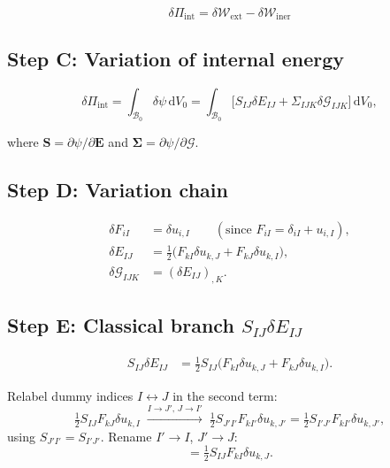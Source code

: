 \documentclass[11pt]{article}
\begin{document}
\begin{equation}
\boxed{\delta\Pi_{\mathrm{int}} = \delta\mathcal{W}_{\mathrm{ext}} - \delta\mathcal{W}_{\mathrm{iner}}}
\label{app:equilibrium}
\end{equation}

\subsection{Step C: Variation of internal energy}

\begin{equation}
\delta\Pi_{\mathrm{int}}
= \int_{\mathcal{B}_0}\delta\psi\,\mathrm{d}V_0
= \int_{\mathcal{B}_0}\bigl[S_{IJ}\delta E_{IJ} + \Sigma_{IJK}\delta\mathcal{G}_{IJK}\bigr]\,\mathrm{d}V_0,
\end{equation}

where $\mathbf{S}=\partial\psi/\partial\mathbf{E}$ and $\boldsymbol{\Sigma}=\partial\psi/\partial\boldsymbol{\mathcal{G}}$.

\subsection{Step D: Variation chain}

\begin{align}
\delta F_{iI} &= \delta u_{i,I} \qquad(\text{since }F_{iI}=\delta_{iI}+u_{i,I}),\\
\delta E_{IJ} &= \tfrac{1}{2}\bigl(F_{kI}\delta u_{k,J}+F_{kJ}\delta u_{k,I}\bigr),\\
\delta\mathcal{G}_{IJK} &= (\delta E_{IJ})_{,K}.
\end{align}

\subsection{Step E: Classical branch $S_{IJ}\delta E_{IJ}$}

\begin{align}
S_{IJ}\delta E_{IJ}
&= \tfrac{1}{2}S_{IJ}\bigl(F_{kI}\delta u_{k,J}+F_{kJ}\delta u_{k,I}\bigr).
\end{align}

Relabel dummy indices $I\leftrightarrow J$ in the second term:
\begin{equation}
\tfrac{1}{2}S_{IJ}F_{kJ}\delta u_{k,I}
\;\xrightarrow{I\to J',\,J\to I'}\;
\tfrac{1}{2}S_{J'I'}F_{kI'}\delta u_{k,J'}
= \tfrac{1}{2}S_{I'J'}F_{kI'}\delta u_{k,J'},
\end{equation}
using $S_{J'I'}=S_{I'J'}$. Rename $I'\to I$, $J'\to J$:
\begin{equation}
= \tfrac{1}{2}S_{IJ}F_{kI}\delta u_{k,J}.
\end{equation}
\end{document}
